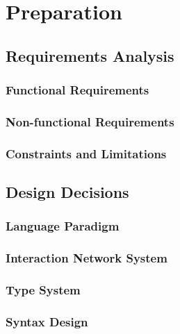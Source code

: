 \chapter{Preparation}

\section{Requirements Analysis}

\subsection{Functional Requirements}

\subsection{Non-functional Requirements}

\subsection{Constraints and Limitations}

\section{Design Decisions}

\subsection{Language Paradigm}

\subsection{Interaction Network System}

\subsection{Type System}

\subsection{Syntax Design}

